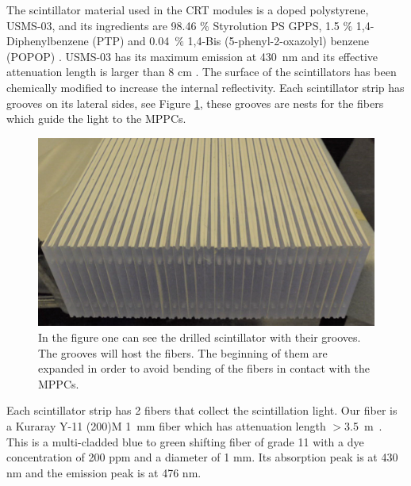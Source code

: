 \documentclass[a4paper]{article}\linespread{1.4}
\begin{document}
The scintillator material used in the CRT modules is a doped polystyrene, USMS-03, and its ingredients are 98.46 $\%$ Styrolution PS GPPS, 1.5  $\%$ 1,4-Diphenylbenzene (PTP) and 0.04~$\%$ 1,4-Bis (5-phenyl-2-oxazolyl) benzene (POPOP) \cite{C}. USMS-03 has its maximum emission at 430~nm and its effective attenuation length is larger than 8 cm %
\cite{E}.
The surface of the scintillators has been chemically modified to increase the internal reflectivity. Each scintillator strip has grooves on its lateral sides, see Figure \ref{fig:drilled}, these grooves are nests for the fibers which guide the light to the MPPCs.
\begin{figure}[h!] \centering \includegraphics[width=120mm,scale=2.0]{drilledpaint.png} \caption{In the figure one can see the drilled scintillator with their grooves. The grooves will host the fibers. The beginning of them are expanded in order to avoid bending of the fibers in contact with the MPPCs.}  \label{fig:drilled}\end{figure}

Each scintillator strip has 2 fibers that collect the scintillation light.
Our fiber is a Kuraray Y-11 (200)M 1~mm fiber which has attenuation length $ >$3.5~m~\cite{D}. This is a multi-cladded blue to green shifting fiber of grade 11 with a dye concentration of 200 ppm and a diameter of 1 mm.
Its absorption peak is at 430 nm and the emission peak is at 476 nm. 
\end{document}
